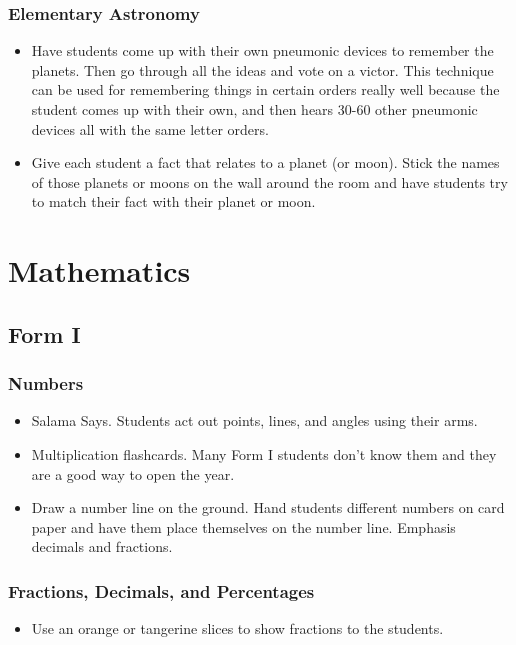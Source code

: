  \subsubsection{Elementary Astronomy}
\begin{itemize}
\item	Have students come up with their own pneumonic devices to remember the planets. Then go through all the ideas and vote on a victor. This technique can be used for remembering things in certain orders really well because the student comes up with their own, and then hears 30-60 other pneumonic devices all with the same letter orders. 
\item	Give each student a fact that relates to a planet (or moon). Stick the names of those planets or moons on the wall around the room and have students try to match their fact with their planet or moon. 
\end{itemize}

\section{Mathematics}
\subsection{Form I}
\subsubsection{Numbers}
\begin{itemize}
\item	Salama Says. Students act out points, lines, and angles using their arms.  
\item	Multiplication flashcards. Many Form I students don't know them and they are a good way to open the year.  
\item	Draw a number line on the ground.  Hand students different numbers on card paper and have them place themselves on the number line.  Emphasis decimals and fractions.
\end{itemize}

\subsubsection{Fractions, Decimals, and Percentages}
\begin{itemize}
\item  Use an orange or tangerine slices to show fractions to the students.
\end{itemize}

